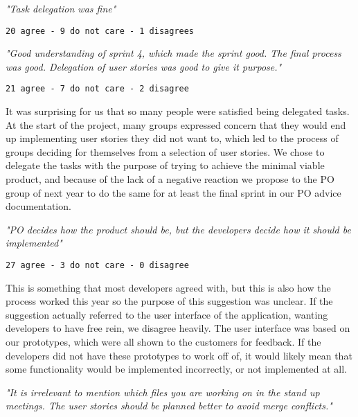 \begin{center}
    \textit{"Task delegation was fine"}
\end{center}

\begin{center}
    \texttt{20 agree - 9 do not care - 1 disagrees}    
\end{center}

\begin{center}
    \textit{"Good understanding of sprint 4, which made the sprint good. The final process was good. Delegation of user stories was good to give it purpose."}
\end{center}

\begin{center}
    \texttt{21 agree - 7 do not care - 2 disagree}  
\end{center}
It was surprising for us that so many people were satisfied being delegated tasks. 
At the start of the project, many groups expressed concern that they would end up implementing user stories they did not want to, which led to the process of groups deciding for themselves from a selection of user stories.
We chose to delegate the tasks with the purpose of trying to achieve the minimal viable product, and because of the lack of a negative reaction we propose to the PO group of next year to do the same for at least the final sprint in our PO advice documentation.

\begin{center}
    \textit{"PO decides how the product should be, but the developers decide how it should be implemented"}
\end{center}

\begin{center}
    \texttt{27 agree - 3 do not care - 0 disagree}
\end{center}
This is something that most developers agreed with, but this is also how the process worked this year so the purpose of this suggestion was unclear.
If the suggestion actually referred to the user interface of the application, wanting developers to have free rein, we disagree heavily.
The user interface was based on our prototypes, which were all shown to the customers for feedback. 
If the developers did not have these prototypes to work off of, it would likely mean that some functionality would be implemented incorrectly, or not implemented at all.

\begin{center}
    \textit{"It is irrelevant to mention which files you are working on in the stand up meetings. The user stories should be planned better to avoid merge conflicts."}
\end{center}


